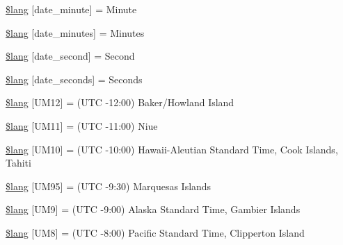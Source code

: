 \begin{DoxyCompactItemize}
\item 
\hyperlink{system_2language_2english_2date__lang_8php_a999a95f4f9c529af571d30f9615c93f3}{\$lang} \mbox{[}\textquotesingle{}date\+\_\+minute\textquotesingle{}\mbox{]} = \textquotesingle{}Minute\textquotesingle{}
\item 
\hyperlink{system_2language_2english_2date__lang_8php_ab41862e6c3ef784a6e32992cfb9a6e1c}{\$lang} \mbox{[}\textquotesingle{}date\+\_\+minutes\textquotesingle{}\mbox{]} = \textquotesingle{}Minutes\textquotesingle{}
\item 
\hyperlink{system_2language_2english_2date__lang_8php_ac1b67b9034a78d631bf5302df6105136}{\$lang} \mbox{[}\textquotesingle{}date\+\_\+second\textquotesingle{}\mbox{]} = \textquotesingle{}Second\textquotesingle{}
\item 
\hyperlink{system_2language_2english_2date__lang_8php_a0a75c76e6e4be09a6c5f1a1727fa2c78}{\$lang} \mbox{[}\textquotesingle{}date\+\_\+seconds\textquotesingle{}\mbox{]} = \textquotesingle{}Seconds\textquotesingle{}
\item 
\hyperlink{system_2language_2english_2date__lang_8php_aa03db528f49f0bdd57489a7e057a95dc}{\$lang} \mbox{[}\textquotesingle{}U\+M12\textquotesingle{}\mbox{]} = \textquotesingle{}(U\+T\+C -\/12\+:00) Baker/Howland Island\textquotesingle{}
\item 
\hyperlink{system_2language_2english_2date__lang_8php_a2257b69398113162bdafb48f1bab4973}{\$lang} \mbox{[}\textquotesingle{}U\+M11\textquotesingle{}\mbox{]} = \textquotesingle{}(U\+T\+C -\/11\+:00) Niue\textquotesingle{}
\item 
\hyperlink{system_2language_2english_2date__lang_8php_a671d507e120e16f7e7718be0ed0aea74}{\$lang} \mbox{[}\textquotesingle{}U\+M10\textquotesingle{}\mbox{]} = \textquotesingle{}(U\+T\+C -\/10\+:00) Hawaii-\/Aleutian Standard Time, Cook Islands, Tahiti\textquotesingle{}
\item 
\hyperlink{system_2language_2english_2date__lang_8php_a7cd7a4418ccf42c7daae2a098ba8f9e6}{\$lang} \mbox{[}\textquotesingle{}U\+M95\textquotesingle{}\mbox{]} = \textquotesingle{}(U\+T\+C -\/9\+:30) Marquesas Islands\textquotesingle{}
\item 
\hyperlink{system_2language_2english_2date__lang_8php_a5509302f8ddd971cb58e1f49f012bbac}{\$lang} \mbox{[}\textquotesingle{}U\+M9\textquotesingle{}\mbox{]} = \textquotesingle{}(U\+T\+C -\/9\+:00) Alaska Standard Time, Gambier Islands\textquotesingle{}
\item 
\hyperlink{system_2language_2english_2date__lang_8php_ab3ed4c273fcb61197ef7d8e4bae07415}{\$lang} \mbox{[}\textquotesingle{}U\+M8\textquotesingle{}\mbox{]} = \textquotesingle{}(U\+T\+C -\/8\+:00) Pacific Standard Time, Clipperton Island\textquotesingle{}

\end{DoxyCompactItemize}
